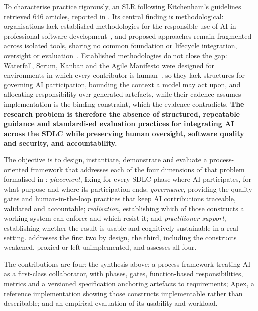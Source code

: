 To characterise practice rigorously, an \ac{SLR} following Kitchenham's guidelines retrieved 646 articles, reported in . Its central finding is methodological: organisations lack established methodologies for the responsible use of \ac{AI} in professional software development~\cite{Banh:2025cf, Farhanna:2025eu, Hemmat:2025rd, Gao:2025cc}, and proposed approaches remain fragmented across isolated tools, sharing no common foundation on lifecycle integration, oversight or evaluation~\cite{Ahmed:2025ai}. Established methodologies do not close the gap: Waterfall, Scrum, Kanban and the Agile Manifesto were designed for environments in which every contributor is human~\cite{Zhang:2025ea}, so they lack structures for governing AI participation, bounding the context a model may act upon, and allocating responsibility over generated artefacts, while their cadence assumes implementation is the binding constraint, which the evidence contradicts. \textbf{The research problem is therefore the absence of structured, repeatable guidance and standardised evaluation practices for integrating \ac{AI} across the \ac{SDLC} while preserving human oversight, software quality and security, and accountability.}

\label{sec:intro_objectives}%
The objective is to design, instantiate, demonstrate and evaluate a process-oriented framework that addresses each of the four dimensions of that problem formalised in : \emph{placement}, fixing for every \ac{SDLC} phase where AI participates, for what purpose and where its participation ends; \emph{governance}, providing the quality gates and human-in-the-loop practices that keep AI contributions traceable, validated and accountable; \emph{realisation}, establishing which of those constructs a working system can enforce and which resist it; and \emph{practitioner support}, establishing whether the result is usable and cognitively sustainable in a real setting.  addresses the first two by design,  the third, including the constructs weakened, proxied or left unimplemented, and  assesses all four.

The contributions are four: the synthesis above; a process framework treating AI as a first-class collaborator, with phases, gates, function-based responsibilities, metrics and a versioned specification anchoring artefacts to requirements; Apex, a reference implementation showing those constructs implementable rather than describable; and an empirical evaluation of its usability and workload.